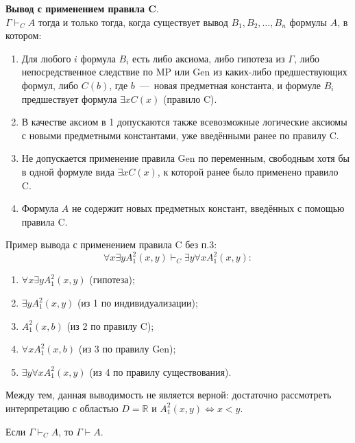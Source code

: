 \textbf{Вывод с применением правила C}. \\
$\Gamma \vdash_C A$ тогда и только тогда, когда существует вывод $B_1, B_2, \dots, B_n$ формулы $A$, в котором:
\begin{enumerate}
    \item Для любого $i$ формула $B_i$ есть либо аксиома, либо гипотеза из $\Gamma$, либо непосредственное следствие по MP или Gen из каких-либо предшествующих формул, либо $C(b)$, где $b$~---~новая предметная константа, и формуле $B_i$ предшествует формула $\exists xC(x)$ (правило C).
    \item В качестве аксиом в 1 допускаются также всевозможные логические аксиомы с новыми предметными константами, уже введёнными ранее по правилу C.
    \item Не допускается применение правила Gen по переменным, свободным хотя бы в одной формуле вида $\exists xC(x)$, к которой ранее было применено правило C.
    \item Формула $A$ не содержит новых предметных констант, введённых с помощью правила C.
\end{enumerate}
Пример вывода с применением правила C без п.3:
\[
    \forall x\exists yA_1^2(x, y) \vdash_C \exists y\forall xA_1^2(x, y):
\]
\begin{enumerate}
    \item $\forall x\exists yA_1^2(x, y)$ (гипотеза);
    \item $\exists yA_1^2(x, y)$ (из 1 по индивидуализации);
    \item $A_1^2(x, b)$ (из 2 по правилу C);
    \item $\forall xA_1^2(x, b)$ (из 3 по правилу Gen);
    \item $\exists y\forall xA_1^2(x, y)$ (из 4 по правилу существования).
\end{enumerate}
Между тем, данная выводимость не является верной: достаточно рассмотреть интерпретацию с областью $D = \mathbb{R}$ и $A_1^2(x, y) \Longleftrightarrow x < y$.
\begin{theorem}\label{th:c_rule_inference}
    Если $\Gamma \vdash_C A$, то $\Gamma \vdash A$.
\end{theorem}
